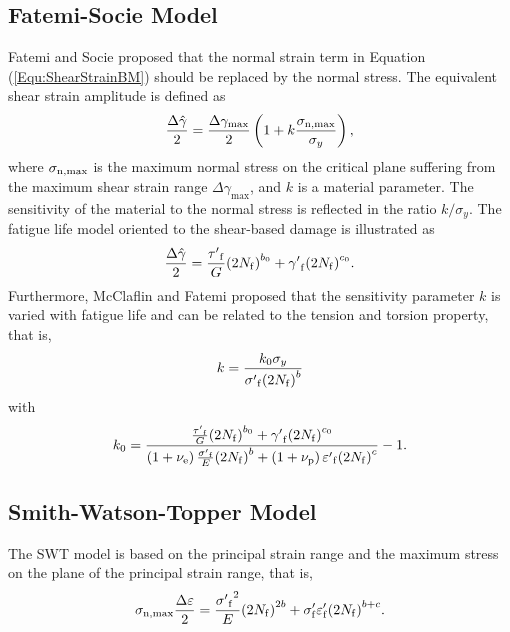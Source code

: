 \subsection{Fatemi-Socie Model}
\noindent
Fatemi and Socie \cite{Fatemi1988} proposed that the normal strain term in Equation (\ref{Equ:ShearStrainBM}) should be replaced by the normal stress.
The equivalent shear strain amplitude is defined as
\begin{equation}
\frac{{\Delta \hat \gamma }}{2} = \frac{{\Delta {\gamma _{\max }}}}{2}\left( {1 + k\frac{{{\sigma _{\rm n,\max}}}}{{{\sigma _y}}}} \right),
\end{equation}
where
$\sigma _{\rm n,\max}$ is the maximum normal stress on the critical plane suffering from the maximum shear strain range $\Delta {\gamma _{\max}}$, and $k$ is a material parameter. The sensitivity of the material to the normal stress is reflected in the ratio $k/\sigma_y$.
The fatigue life model oriented to the shear-based damage is illustrated as
\begin{equation}
\frac{{\Delta \hat \gamma }}{2} = \frac{{{{\tau '}_{\rm f}}}}{G}{\left( {2{N_{\rm f}}} \right)^{{b_0}}} + {{\gamma '}_{\rm f}}{\left( {2{N_{\rm f}}} \right)^{{c_0}}}.
\label{Equ:FS_model}
\end{equation}
Furthermore, McClaflin and Fatemi \cite{McClaflin2004} proposed that the sensitivity parameter $k$ is varied with fatigue life and can be related to the tension and torsion property, that is,
\begin{equation}
k =  \frac{{k_0 {\sigma _y}}}{{{{\sigma '}_{\rm f}}{{\left( {2{N_{\rm f}}} \right)}^b}}}
\end{equation}
with
\[
k_0 =  {\frac{{\frac{{{{\tau '}_{\rm f}}}}{G}{{\left( {2{N_{\rm f}}} \right)}^{{b_0}}} + {{\gamma '}_{\rm f}}{{\left( {2{N_{\rm f}}} \right)}^{{c_0}}}}}{{\left( {1 + {\nu _{\rm e}}} \right)\frac{{{{\sigma '}_{\rm f}}}}{E}{{\left( {2{N_{\rm f}}} \right)}^b} + \left( {1 + {\nu _{\rm p}}} \right){{\varepsilon '}_{\rm f}}{{\left( {2{N_{\rm f}}} \right)}^c}}} - 1} .
\]


\subsection{Smith-Watson-Topper Model}
\noindent
The SWT model \cite{Socie2000} is based on the principal strain range and the maximum stress on the plane of the principal
strain range, that is,
\begin{equation}
{\sigma _{\rm n, \max}}\frac{{\Delta \varepsilon }}{2} = \frac{{{{\sigma '}_{\rm f}}^2}}{E}{\left( {2{N_{\rm f}}} \right)^{2b}} + {\sigma '_{\rm f}}{\varepsilon '_{\rm f}}{\left( {2{N_{\rm f}}} \right)^{b + c}}.
\label{Equ:SWT_model}
\end{equation}

